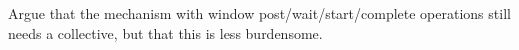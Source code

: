   Argue that the mechanism with window post/wait/start/complete operations
  still needs a collective, but that this is less burdensome.
